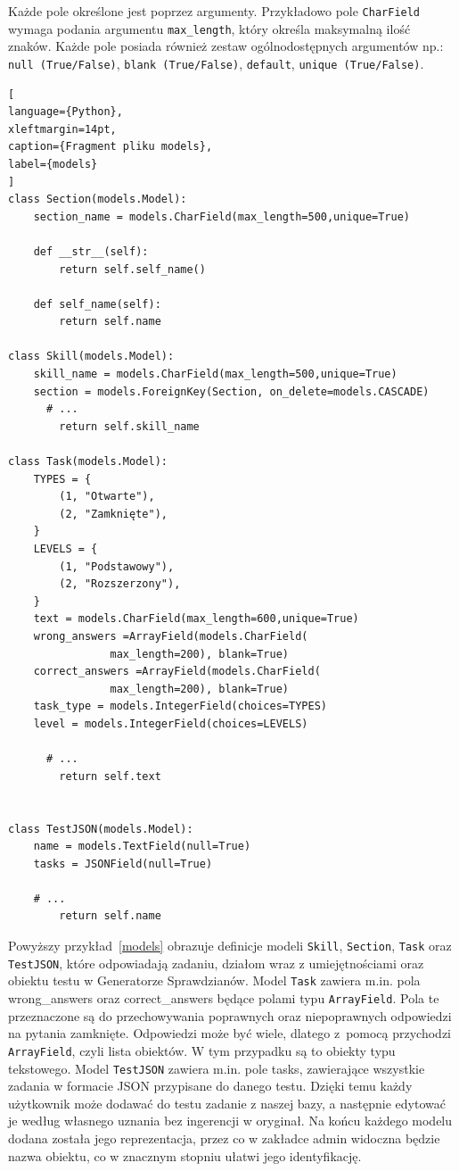 \documentclass[oneside,polski,logo,indent]{amuthesis}
\begin{document}
Każde pole określone jest poprzez argumenty. Przykładowo pole \texttt{CharField} wymaga podania argumentu \texttt{max\_length}, który określa maksymalną ilość znaków. Każde pole posiada również zestaw ogólnodostępnych argumentów np.: \texttt{null (True/False)}, \texttt{blank (True/False)}, \texttt{default}, \texttt{unique (True/False)}.

\begin{lstlisting}[
language={Python},
xleftmargin=14pt,
caption={Fragment pliku models},
label={models}
]
class Section(models.Model):
    section_name = models.CharField(max_length=500,unique=True)

    def __str__(self):
        return self.self_name()

    def self_name(self):
        return self.name

class Skill(models.Model):
    skill_name = models.CharField(max_length=500,unique=True)
    section = models.ForeignKey(Section, on_delete=models.CASCADE)
	  # ...
        return self.skill_name

class Task(models.Model):
    TYPES = {
        (1, "Otwarte"),
        (2, "Zamknięte"),
    }
    LEVELS = {
        (1, "Podstawowy"),
        (2, "Rozszerzony"),
    }
    text = models.CharField(max_length=600,unique=True)
    wrong_answers =ArrayField(models.CharField(
				max_length=200), blank=True)
    correct_answers =ArrayField(models.CharField(
				max_length=200), blank=True)
    task_type = models.IntegerField(choices=TYPES)
    level = models.IntegerField(choices=LEVELS)

	  # ...
        return self.text


class TestJSON(models.Model):
    name = models.TextField(null=True)
    tasks = JSONField(null=True)

    # ...
        return self.name
\end{lstlisting}

Powyższy przykład~\ref{models} obrazuje definicje modeli \texttt{Skill}, \texttt{Section}, \texttt{Task} oraz \texttt{TestJSON}, 
które odpowiadają zadaniu, działom wraz z umiejętnościami oraz obiektu testu w Generatorze Sprawdzianów. 
Model \texttt{Task} zawiera m.in. pola wrong\_answers oraz correct\_answers będące polami typu \texttt{ArrayField}. Pola te przeznaczone
są do przechowywania poprawnych oraz niepoprawnych odpowiedzi na pytania zamknięte. Odpowiedzi może być wiele, dlatego z~pomocą
przychodzi \texttt{ArrayField}, czyli lista obiektów. W tym przypadku są to obiekty typu tekstowego.
Model \texttt{TestJSON} zawiera m.in. pole tasks, zawierające wszystkie zadania w formacie JSON przypisane do danego testu.
Dzięki temu każdy użytkownik może dodawać do testu zadanie z naszej bazy, a następnie edytować je według własnego uznania bez ingerencji
w oryginał.
Na końcu każdego modelu dodana została jego reprezentacja, przez co w zakładce admin widoczna będzie nazwa obiektu, co w znacznym stopniu ułatwi jego identyfikację.
\end{document}
